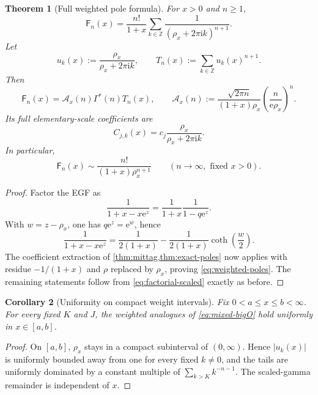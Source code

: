 \documentclass[11pt,a4paper,oneside]{article}
\newtheorem{theorem}{Theorem}[section]
\newtheorem{corollary}[theorem]{Corollary}
\theoremstyle{definition}
\theoremstyle{remark}
\newcommand{\Fub}{\mathsf{F}}
\newcommand{\e}{\mathrm{e}}
\newcommand{\ii}{\mathrm{i}}
\newcommand{\GammaStar}{\Gamma^{\!*}}
\begin{document}
\begin{theorem}[Full weighted pole formula]\label{thm:weighted-poles}
For $x>0$ and $n\ge1$,
\begin{equation}\label{eq:weighted-poles}
 \boxed{\displaystyle
 \Fub_n(x)=\frac{n!}{1+x}
 \sum_{k\in\mathbb Z}
 \frac{1}{(\rho_x+2\pi\ii k)^{n+1}}.}
\end{equation}
Let
\[
 u_k(x):=\frac{\rho_x}{\rho_x+2\pi\ii k},
 \qquad
 T_n(x):=\sum_{k\in\mathbb Z}u_k(x)^{n+1}.
\]
Then
\begin{equation}\label{eq:weighted-exact-factor}
 \Fub_n(x)=\mathcal A_x(n)\GammaStar(n)T_n(x),
 \qquad
 \mathcal A_x(n):=
 \frac{\sqrt{2\pi n}}{(1+x)\rho_x}
 \left(\frac{n}{\e\rho_x}\right)^n.
\end{equation}
Its full elementary-scale coefficients are
\begin{equation}\label{eq:weighted-Cjk}
 C_{j,k}(x)=c_j\frac{\rho_x}{\rho_x+2\pi\ii k}.
\end{equation}
In particular,
\begin{equation}\label{eq:weighted-leading}
 \Fub_n(x)\sim\frac{n!}{(1+x)\rho_x^{n+1}}
 \qquad(n\to\infty,\text{ fixed }x>0).
\end{equation}
\end{theorem}

\begin{proof}
Factor the EGF as
\[
 \frac{1}{1+x-x\e^z}
 =\frac{1}{1+x}\frac{1}{1-q\e^z}.
\]
With $w=z-\rho_x$, one has $q\e^z=\e^w$, hence
\[
 \frac{1}{1+x-x\e^z}
 =\frac{1}{2(1+x)}-
  \frac{1}{2(1+x)}\coth\!\left(\frac w2\right).
\]
The coefficient extraction of \cref{thm:mittag,thm:exact-poles} now applies
with residue $-1/(1+x)$ and $\rho$ replaced by $\rho_x$, proving
\cref{eq:weighted-poles}.  The remaining statements follow from
\cref{eq:factorial-scaled} exactly as before.
\end{proof}

\begin{corollary}[Uniformity on compact weight intervals]
Fix $0<a\le x\le b<\infty$.  For every fixed $K$ and $J$, the weighted
analogues of \cref{eq:mixed-bigO} hold uniformly in $x\in[a,b]$.
\end{corollary}

\begin{proof}
On $[a,b]$, $\rho_x$ stays in a compact subinterval of $(0,\infty)$.  Hence
$|u_k(x)|$ is uniformly bounded away from one for every fixed $k\ne0$, and
the tails are uniformly dominated by a constant multiple of
$\sum_{k>K}k^{-n-1}$.  The scaled-gamma remainder is independent of $x$.
\end{proof}
\end{document}
